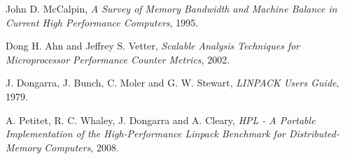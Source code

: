 \documentclass[a4paper]{report}
\begin{document}
\begin{thebibliography}{9}
 John D. McCalpin,
 \emph{A Survey of Memory Bandwidth and Machine Balance in Current High Performance Computers},
 1995.

 Dong H. Ahn and Jeffrey S. Vetter,
 \emph{Scalable Analysis Techniques for Microprocessor Performance Counter Metrics},
 2002.

 J. Dongarra, J. Bunch, C. Moler and G. W. Stewart, 
 \emph{LINPACK Users Guide},
 1979.

 A. Petitet, R. C. Whaley, J. Dongarra and A. Cleary, 
 \emph{HPL - A Portable Implementation of the High-Performance Linpack Benchmark for Distributed-Memory Computers},
 2008.

\end{thebibliography}
\end{document}
